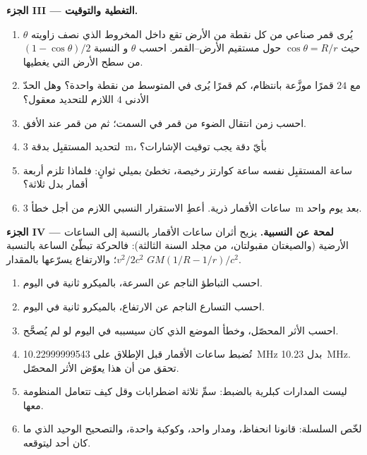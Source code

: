 \begin{problem}
\medskip
\noindent\textbf{الجزء III --- التغطية والتوقيت.}
\begin{enumerate}[resume]
  \item يُرى قمر صناعي من كل نقطة من الأرض تقع
        داخل المخروط الذي نصف زاويته $\theta$ حيث $\cos\theta = R/r$
        حول مستقيم الأرض--القمر. احسب $\theta$ و
        النسبة $(1 - \cos\theta)/2$ من سطح الأرض التي يغطيها.
  \item مع $24$ قمرًا موزَّعة بانتظام، كم قمرًا يُرى في
        المتوسط من نقطة واحدة؟ وهل الحدّ الأدنى $4$ اللازم للتحديد
        معقول؟
  \item احسب زمن انتقال الضوء من قمر في السمت؛ ثم من قمر عند
        الأفق.
  \item لتحديد المستقبِل بدقة \qty{3}{m}، بأيّ دقة يجب توقيت
        الإشارات؟
  \item ساعة المستقبِل نفسه ساعة كوارتز رخيصة، تخطئ
        بميلي ثوانٍ: فلماذا تلزم أربعة أقمار بدل ثلاثة؟
  \item ساعات الأقمار ذرية. أعطِ الاستقرار النسبي
        اللازم من أجل خطأ \qty{3}{m} بعد يوم واحد.
\end{enumerate}

\medskip
\noindent\textbf{الجزء IV --- لمحة عن النسبية.}
يزيح أثران ساعات الأقمار بالنسبة إلى الساعات الأرضية
(والصيغتان مقبولتان، من مجلد السنة الثالثة): فالحركة تبطّئ الساعة بالنسبة
$v^2/2c^2$؛ والارتفاع يسرّعها بالمقدار $GM(1/R - 1/r)/c^2$.
\begin{enumerate}[resume]
  \item احسب التباطؤ الناجم عن السرعة، بالميكرو ثانية في اليوم.
  \item احسب التسارع الناجم عن الارتفاع، بالميكرو ثانية في
        اليوم.
  \item احسب الأثر المحصّل، وخطأ الموضع الذي كان سيسببه في اليوم لو
        لم يُصحَّح.
  \item تُضبط ساعات الأقمار قبل الإطلاق على
        \qty{10.22999999543}{MHz} بدل \qty{10.23}{MHz}. تحقق من أن
        هذا يعوّض الأثر المحصّل.
  \item ليست المدارات كبلرية بالضبط: سمِّ ثلاثة اضطرابات
        وقل كيف تتعامل المنظومة معها.
  \item لخّص السلسلة: قانونا انحفاظ، ومدار واحد، وكوكبة
        واحدة، والتصحيح الوحيد الذي ما كان أحد ليتوقعه.
\end{enumerate}
\end{problem}

